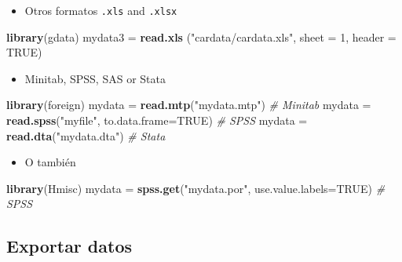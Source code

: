 \documentclass[]{article}
\def\tightlist{}
\newenvironment{Shaded}{\begin{snugshade}}{\end{snugshade}}
\newcommand{\KeywordTok}[1]{\textcolor[rgb]{0.13,0.29,0.53}{\textbf{{#1}}}}
\newcommand{\DataTypeTok}[1]{\textcolor[rgb]{0.13,0.29,0.53}{{#1}}}
\newcommand{\DecValTok}[1]{\textcolor[rgb]{0.00,0.00,0.81}{{#1}}}
\newcommand{\StringTok}[1]{\textcolor[rgb]{0.31,0.60,0.02}{{#1}}}
\newcommand{\CommentTok}[1]{\textcolor[rgb]{0.56,0.35,0.01}{\textit{{#1}}}}
\newcommand{\OtherTok}[1]{\textcolor[rgb]{0.56,0.35,0.01}{{#1}}}
\newcommand{\NormalTok}[1]{{#1}}
\numberwithin{equation}{section}
\begin{document}
\begin{itemize}
\tightlist
\item
  Otros formatos \texttt{.xls} and \texttt{.xlsx}
\end{itemize}

\begin{Shaded}
\begin{Highlighting}[]
\KeywordTok{library}\NormalTok{(gdata)}
\NormalTok{mydata3 =}\StringTok{ }\KeywordTok{read.xls} \NormalTok{(}\StringTok{"cardata/cardata.xls"}\NormalTok{, }\DataTypeTok{sheet =} \DecValTok{1}\NormalTok{, }\DataTypeTok{header =} \OtherTok{TRUE}\NormalTok{)}
\end{Highlighting}
\end{Shaded}

\begin{itemize}
\tightlist
\item
  Minitab, SPSS, SAS or Stata
\end{itemize}

\begin{Shaded}
\begin{Highlighting}[]
\KeywordTok{library}\NormalTok{(foreign)                   }
\NormalTok{mydata =}\StringTok{ }\KeywordTok{read.mtp}\NormalTok{(}\StringTok{"mydata.mtp"}\NormalTok{)  }\CommentTok{# Minitab}
\NormalTok{mydata =}\StringTok{ }\KeywordTok{read.spss}\NormalTok{(}\StringTok{"myfile"}\NormalTok{, }\DataTypeTok{to.data.frame=}\OtherTok{TRUE}\NormalTok{) }\CommentTok{# SPSS}
\NormalTok{mydata =}\StringTok{ }\KeywordTok{read.dta}\NormalTok{(}\StringTok{"mydata.dta"}\NormalTok{) }\CommentTok{# Stata}
\end{Highlighting}
\end{Shaded}

\begin{itemize}
\tightlist
\item
  O también
\end{itemize}

\begin{Shaded}
\begin{Highlighting}[]
\KeywordTok{library}\NormalTok{(Hmisc)}
\NormalTok{mydata =}\StringTok{ }\KeywordTok{spss.get}\NormalTok{(}\StringTok{"mydata.por"}\NormalTok{, }\DataTypeTok{use.value.labels=}\OtherTok{TRUE}\NormalTok{)  }\CommentTok{# SPSS}
\end{Highlighting}
\end{Shaded}

\subsection{Exportar datos}\label{exportar-datos}
\end{document}
